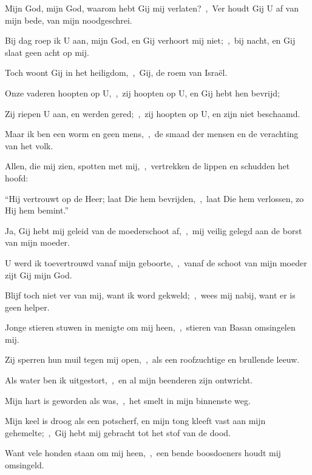 \documentclass[12pt,twoside,a5paper]{article}
\begin{document}
\begin{halfparskip}

   Mijn God, mijn God, waarom hebt Gij mij verlaten?~\sep\ Ver houdt Gij U af van mijn bede, van mijn noodgeschrei.


  Bij dag roep ik U aan, mijn God, en Gij verhoort mij niet;~\sep\ bij nacht, en Gij slaat geen acht op mij.

  Toch woont Gij in het heiligdom,~\sep\ Gij, de roem van Israël.

  Onze vaderen hoopten op U,~\sep\ zij hoopten op U, en Gij hebt hen bevrijd;

  Zij riepen U aan, en werden gered;~\sep\ zij hoopten op U, en zijn niet beschaamd.

  Maar ik ben een worm en geen mens,~\sep\ de smaad der mensen en de verachting van het volk.

  Allen, die mij zien, spotten met mij,~\sep\ vertrekken de lippen en schudden het hoofd:

  ``Hij vertrouwt op de Heer; laat Die hem bevrijden,~\sep\ laat Die hem verlossen, zo Hij hem bemint.''

  Ja, Gij hebt mij geleid van de moederschoot af,~\sep\ mij veilig gelegd aan de borst van mijn moeder.

  U werd ik toevertrouwd vanaf mijn geboorte,~\sep\ vanaf de schoot van mijn moeder zijt Gij mijn God.

  Blijf toch niet ver van mij, want ik word gekweld;~\sep\ wees mij nabij, want er is geen helper.

  Jonge stieren stuwen in menigte om mij heen,~\sep\ stieren van Basan omsingelen mij.

  Zij sperren hun muil tegen mij open,~\sep\ als een roofzuchtige en brullende leeuw.

  Als water ben ik uitgestort,~\sep\ en al mijn beenderen zijn ontwricht.

  Mijn hart is geworden als was,~\sep\ het smelt in mijn binnenste weg.

  Mijn keel is droog als een potscherf, en mijn tong kleeft vast aan mijn gehemelte;~\sep\ Gij hebt mij gebracht tot het stof van de dood.

  Want vele honden staan om mij heen,~\sep\ een bende boosdoeners houdt mij omsingeld.


\end{halfparskip}
\end{document}
